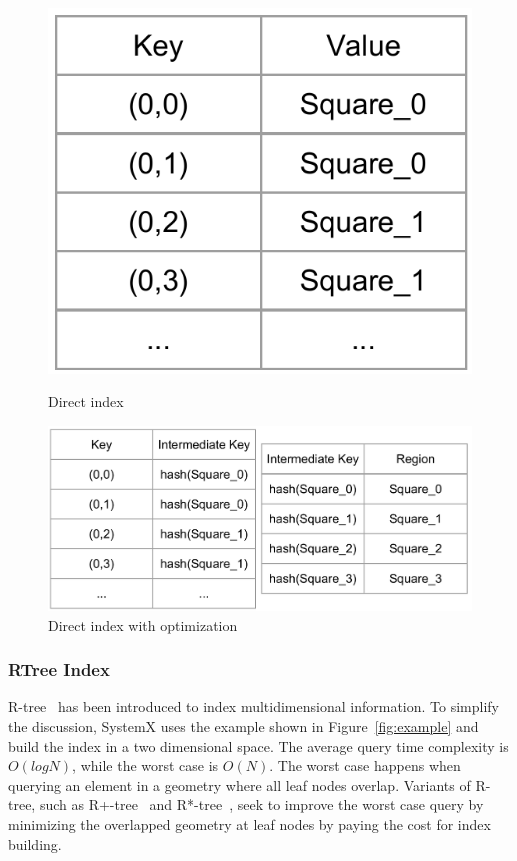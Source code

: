 \documentclass{sig-alternate}
\begin{document}
\begin{figure}
\centering
\begin{minipage}{.3\linewidth}
  \includegraphics[width=\linewidth]{pictures/direct}
  \caption{Direct index}
  \label{fig:direct}
\end{minipage}
\hspace{.05\linewidth}
\begin{minipage}{.6\linewidth}
  \includegraphics[width=\linewidth]{pictures/direct-optimized}
  \caption{Direct index with optimization}
  \label{fig:direct-optimized}
\end{minipage}
\end{figure}


\subsubsection{RTree Index}
R-tree~\cite{guttman1984} has been introduced to index multidimensional information.
To simplify the discussion, SystemX uses the example shown in Figure~\ref{fig:example} and build the index in a two dimensional space.
The average query time complexity is $O(logN)$, while the worst case is $O(N)$. 
The worst case happens when querying an element in a geometry where all leaf nodes overlap.
Variants of R-tree, such as R+-tree~\cite{sellis1987} and R*-tree~\cite{beckmann1990}, 
seek to improve the worst case query by minimizing the overlapped geometry at leaf nodes 
by paying the cost for index building.
\end{document}
